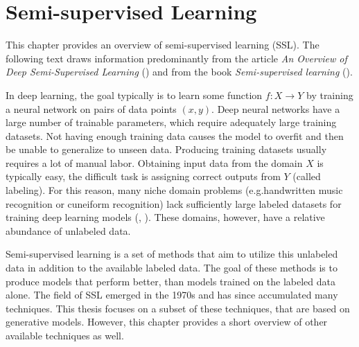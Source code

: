 \chapter{Semi-supervised Learning}
\label{chap:SemisupervisedLearning}

This chapter provides an overview of semi-supervised learning (SSL). The following text draws information predominantly from the article \emph{An Overview of Deep Semi-Supervised Learning} (\cite{SemisupervisedOverview}) and from the book \emph{Semi-supervised learning} (\cite{SslBook}).

In deep learning, the goal typically is to learn some function $f: X \rightarrow Y$ by training a neural network on pairs of data points $(x, y)$. Deep neural networks have a large number of trainable parameters, which require adequately large training datasets. Not having enough training data causes the model to overfit and then be unable to generalize to unseen data. Producing training datasets usually requires a lot of manual labor. Obtaining input data from the domain $X$ is typically easy, the difficult task is assigning correct outputs from $Y$ (called labeling). For this reason, many niche domain problems (e.g.\@ handwritten music recognition or cuneiform recognition) lack sufficiently large labeled datasets for training deep learning models (\cite{MuscimaPP}, \cite{Cuneiforms}). These domains, however, have a relative abundance of unlabeled data.

Semi-supervised learning is a set of methods that aim to utilize this unlabeled data in addition to the available labeled data. The goal of these methods is to produce models that perform better, than models trained on the labeled data alone. The field of SSL emerged in the 1970s and has since accumulated many techniques. This thesis focuses on a subset of these techniques, that are based on generative models. However, this chapter provides a short overview of other available techniques as well.

